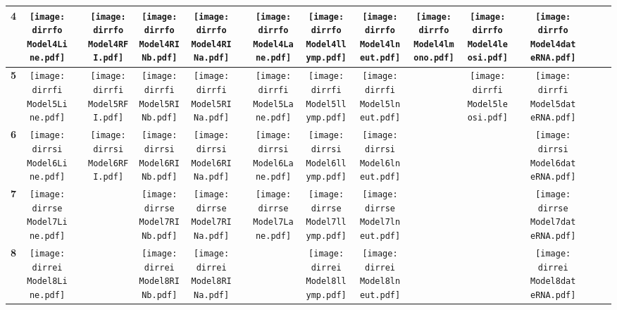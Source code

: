 \documentclass[landscape]{article}
\def \dirrfo {U:/R/RA/Data/Reanalysis Data/resultcbc/Model4.Line.RFI.RINb.RINa.Lane.llymp.lneut.lmono.leosi.dateRNA/}
\def \dirrfi {U:/R/RA/Data/Reanalysis Data/resultcbc/Model5.Line.RFI.RINb.RINa.Lane.llymp.lneut.leosi.dateRNA/}
\def \dirrsi{U:/R/RA/Data/Reanalysis Data/resultcbc/Model6.Line.RFI.RINb.RINa.Lane.llymp.lneut.dateRNA/}
\def \dirrse{U:/R/RA/Data/Reanalysis Data/resultcbc/Model7.Line.RINb.RINa.Lane.llymp.lneut.dateRNA/}
\def \dirrei{U:/R/RA/Data/Reanalysis Data/resultcbc/Model8.Line.RINb.RINa.llymp.lneut.dateRNA/}
\begin{document}
\begin{table}
\begin{tabular}{ccccccccccccccccc}
      {\Huge \textbf{4}} 
      &\texttt{[image: \\dirrfo Model4Line.pdf]}
      &
      &\texttt{[image: \\dirrfo Model4RFI.pdf]}
      &\texttt{[image: \\dirrfo Model4RINb.pdf]}
      &\texttt{[image: \\dirrfo Model4RINa.pdf]}
      &
      &\texttt{[image: \\dirrfo Model4Lane.pdf]}
      &\texttt{[image: \\dirrfo Model4llymp.pdf]}
      &\texttt{[image: \\dirrfo Model4lneut.pdf]}
      &\texttt{[image: \\dirrfo Model4lmono.pdf]}
      &\texttt{[image: \\dirrfo Model4leosi.pdf]}
      &
      &\texttt{[image: \\dirrfo Model4dateRNA.pdf]}
      &
     \\
     \hline
     
     {\Huge \textbf{5}} 
      &\texttt{[image: \\dirrfi Model5Line.pdf]}
      &
      &\texttt{[image: \\dirrfi Model5RFI.pdf]}
      &\texttt{[image: \\dirrfi Model5RINb.pdf]}
      &\texttt{[image: \\dirrfi Model5RINa.pdf]}
      &
      &\texttt{[image: \\dirrfi Model5Lane.pdf]}
      &\texttt{[image: \\dirrfi Model5llymp.pdf]}
      &\texttt{[image: \\dirrfi Model5lneut.pdf]}
      &
      &\texttt{[image: \\dirrfi Model5leosi.pdf]}
      &
      &\texttt{[image: \\dirrfi Model5dateRNA.pdf]}
      &
     \\
     \hline
     {\Huge \textbf{6}} 
      &\texttt{[image: \\dirrsi Model6Line.pdf]}
      &
      &\texttt{[image: \\dirrsi Model6RFI.pdf]}
      &\texttt{[image: \\dirrsi Model6RINb.pdf]}
      &\texttt{[image: \\dirrsi Model6RINa.pdf]}
      &
      &\texttt{[image: \\dirrsi Model6Lane.pdf]}
      &\texttt{[image: \\dirrsi Model6llymp.pdf]}
      &\texttt{[image: \\dirrsi Model6lneut.pdf]}
      &
      &
      &
      &\texttt{[image: \\dirrsi Model6dateRNA.pdf]}
      &
     \\
     \hline
     {\Huge \textbf{7}} 
      &\texttt{[image: \\dirrse Model7Line.pdf]}
      &
      &
      &\texttt{[image: \\dirrse Model7RINb.pdf]}
      &\texttt{[image: \\dirrse Model7RINa.pdf]}
      &
      &\texttt{[image: \\dirrse Model7Lane.pdf]}
      &\texttt{[image: \\dirrse Model7llymp.pdf]}
      &\texttt{[image: \\dirrse Model7lneut.pdf]}
      &
      &
      &
      &\texttt{[image: \\dirrse Model7dateRNA.pdf]}
      &
     \\
     \hline
     {\Huge \textbf{8}} 
      &\texttt{[image: \\dirrei Model8Line.pdf]}
      &
      &
      &\texttt{[image: \\dirrei Model8RINb.pdf]}
      &\texttt{[image: \\dirrei Model8RINa.pdf]}
      &
      &
      &\texttt{[image: \\dirrei Model8llymp.pdf]}
      &\texttt{[image: \\dirrei Model8lneut.pdf]}
      &
      &
      &
      &\texttt{[image: \\dirrei Model8dateRNA.pdf]}
      &
     \\
     \hline
     
\end{tabular}
\end{table}
\end{document}
